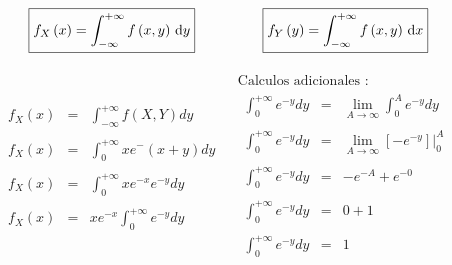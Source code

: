 \documentclass[12pt]{article}
\begin{document}
    \begin{equation*}
        \begin{array}{cp{1cm}c}
            \fbox{$
            f_X\left(x\right) =\displaystyle  \int_{-\infty}^{+\infty} f\left(x,y\right) \,\mathrm{d}y
            $}
            &
            &
            \fbox{$
            f_Y\left(y\right) =\displaystyle  \int_{-\infty}^{+\infty} f\left(x,y\right) \,\mathrm{d}x
            $}
        \end{array}
    \end{equation*}

    \begin{center}
        \begin{equation*}
            \begin{array}{c|c}
                \begin{array}{rcl}
                    f_{X}\left(x\right) & = & \displaystyle\int_{-\infty}^{+\infty}f{\left(X,Y\right)} dy 
                    \\
                    \\
                    f_{X}\left(x\right) & = & \displaystyle\int_{0}^{+\infty}xe^-\left(x+y\right)dy
                    \\
                    \\
                    f_{X}\left(x\right) & = & \displaystyle\int_{0}^{+\infty}xe^{-x}e^{-y}dy
                    \\
                    \\
                    f_{X}\left(x\right) & = & \displaystyle xe^{-x }\int_{0}^{+\infty}e^{-y}dy
                \end{array}
                &
                \begin{array}{l}
                    \mbox{Calculos adicionales :}
                    \\
                    \begin{array}{rcl}
                        \int_{0}^{+\infty}e^{-y}dy & = & \displaystyle\lim_{A\to\infty}\int_{0}^{A}e^{-y}dy
                        \\
                        \\
                        \int_{0}^{+\infty}e^{-y}dy & = & \displaystyle\lim_{A\to\infty}[-e^{-y}]\vert_{0}^{A}
                        \\
                        \\
                        \int_{0}^{+\infty}e^{-y}dy & = & -e^{-A} + e ^{-0}
                        \\
                        \\
                        \int_{0}^{+\infty}e^{-y}dy & = & 0 + 1
                        \\
                        \\
                        \int_{0}^{+\infty}e^{-y}dy & = & 1
                    \end{array}
                \end{array}
            \end{array}
        \end{equation*}
    \end{center}
\end{document}

